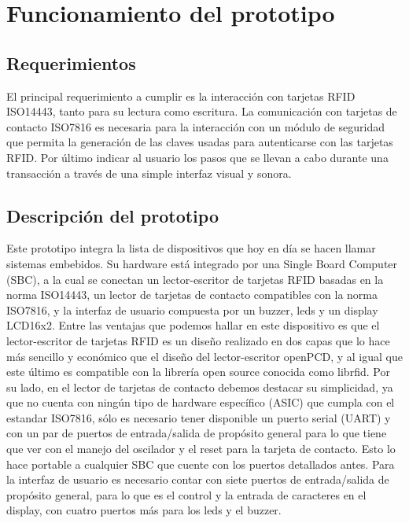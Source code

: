 \chapter{Funcionamiento del prototipo}

\section{Requerimientos}
El principal requerimiento a cumplir es la interacción con tarjetas RFID ISO14443, tanto
para su lectura como escritura.
La comunicación con tarjetas de contacto ISO7816 es necesaria para la interacción con
un módulo de seguridad que permita la generación de las claves usadas para autenticarse
con las tarjetas RFID.
Por último indicar al usuario los pasos que se llevan a cabo durante una transacción
a través de una simple interfaz visual y sonora.

\section{Descripción del prototipo}
Este prototipo integra la lista de dispositivos que hoy en día se hacen llamar sistemas embebidos. Su hardware está integrado por una Single Board Computer (SBC), a la cual se conectan un lector-escritor de tarjetas RFID basadas en la norma ISO14443, un lector de tarjetas de contacto compatibles con la norma ISO7816, y la interfaz de usuario compuesta por un buzzer, leds y un display LCD16x2. %
Entre las ventajas que podemos hallar en este dispositivo es que el lector-escritor de tarjetas RFID es un diseño realizado en dos capas que lo hace más sencillo y económico que el diseño del lector-escritor openPCD, y al igual que este último es compatible con la librería open source conocida como librfid.
Por su lado, en el lector de tarjetas de contacto debemos destacar su simplicidad, ya que no cuenta con ningún tipo de hardware específico (ASIC) que cumpla con el estandar ISO7816, sólo es necesario tener disponible un puerto serial (UART) y con un par de puertos de entrada/salida de propósito general para lo que tiene que ver con el manejo del oscilador y el reset para la tarjeta de contacto. Esto lo hace portable a cualquier SBC que cuente con los puertos detallados antes.
Para la interfaz de usuario es necesario contar con siete puertos de entrada/salida de propósito general, para lo que es el control y la entrada de caracteres en el display, con cuatro puertos más para los leds y el buzzer.


